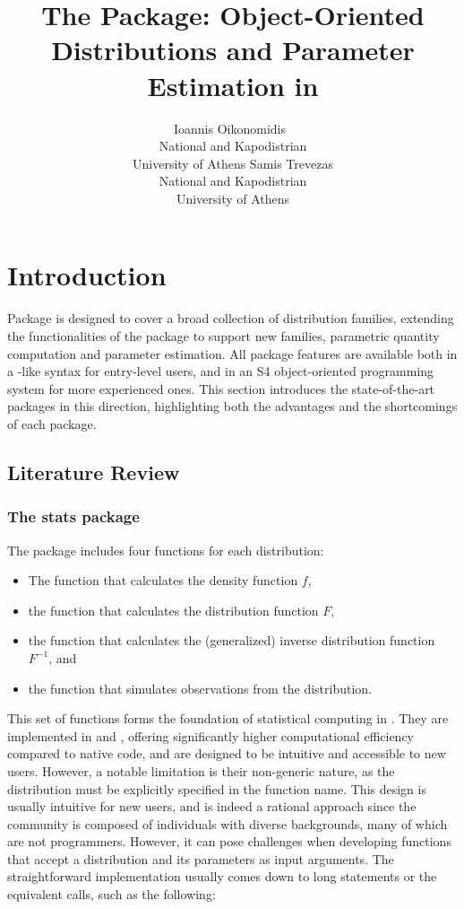 \documentclass[nojss]{jss}
\author{Ioannis Oikonomidis~\orcidlink{0000-0001-8130-2104}\\National and Kapodistrian \\ University of Athens
  \And Samis Trevezas\\National and Kapodistrian \\ University of Athens}
\title{The \pkg{estim} Package: Object-Oriented Distributions and Parameter Estimation in \proglang{R}}
\newcommand{\fct}[1]{\code{#1()}}
\begin{document}
\section[Introduction]{Introduction} \label{s:intro}

Package  is designed to cover a broad collection of distribution families, extending the functionalities of the  package to support new families, parametric quantity computation and parameter estimation. All package features are available both in a -like syntax for entry-level users, and in an S4 object-oriented programming system for more experienced ones. This section introduces the state-of-the-art  packages in this direction, highlighting both the advantages and the shortcomings of each package.

\subsection[Literature Review]{Literature Review}\label{ss:review}

\subsubsection[The stats package]{The stats package}\label{ss:stats}

The  package includes four functions for each distribution:
\begin{itemize}
  \item The \fct{d<name>} function that calculates the density function $f$,
  \item the \fct{p<name>} function that calculates the distribution function $F$,
  \item the \fct{q<name>} function that calculates the (generalized) inverse distribution function $F^{-1}$, and
  \item the \fct{r<name>} function that simulates observations from the distribution.
\end{itemize}

This set of functions forms the foundation of statistical computing in . They are implemented in  and , offering significantly higher computational efficiency compared to native  code, and are designed to be intuitive and accessible to new users. However, a notable limitation is their non-generic nature, as the distribution must be explicitly specified in the function name. This design is usually intuitive for new users, and is indeed a rational approach since the   community is composed of individuals with diverse backgrounds, many of which are not programmers. However, it can pose challenges when developing functions that accept a distribution and its parameters as input arguments. The straightforward implementation usually comes down to long  statements or the equivalent \fct{switch} calls, such as the following:
\end{document}
